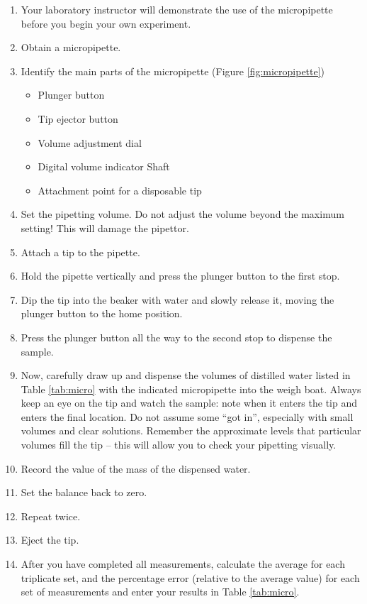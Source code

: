 \documentclass[]{book}
\providecommand{\tightlist}{%
  \setlength{\itemsep}{0pt}\setlength{\parskip}{0pt}}
\begin{document}
\begin{enumerate}
\def\labelenumi{\arabic{enumi}.}
\tightlist
\item
  Your laboratory instructor will demonstrate the use of the
  micropipette before you begin your own experiment.
\item
  Obtain a micropipette.
\item
  Identify the main parts of the micropipette (Figure
  \ref{fig:micropipette})

  \begin{itemize}
  \tightlist
  \item
    Plunger button
  \item
    Tip ejector button
  \item
    Volume adjustment dial
  \item
    Digital volume indicator Shaft
  \item
    Attachment point for a disposable tip
  \end{itemize}
\item
  Set the pipetting volume. Do not adjust the volume beyond the maximum
  setting! This will damage the pipettor.
\item
  Attach a tip to the pipette.
\item
  Hold the pipette vertically and press the plunger button to the first
  stop.
\item
  Dip the tip into the beaker with water and slowly release it, moving
  the plunger button to the home position.
\item
  Press the plunger button all the way to the second stop to dispense
  the sample.
\item
  Now, carefully draw up and dispense the volumes of distilled water
  listed in Table \ref{tab:micro} with the indicated micropipette into
  the weigh boat. Always keep an eye on the tip and watch the sample:
  note when it enters the tip and enters the final location. Do not
  assume some ``got in'', especially with small volumes and clear
  solutions. Remember the approximate levels that particular volumes
  fill the tip -- this will allow you to check your pipetting visually.
\item
  Record the value of the mass of the dispensed water.
\item
  Set the balance back to zero.
\item
  Repeat twice.
\item
  Eject the tip.
\item
  After you have completed all measurements, calculate the average for
  each triplicate set, and the percentage error (relative to the average
  value) for each set of measurements and enter your results in Table
  \ref{tab:micro}.
\end{enumerate}
\end{document}
